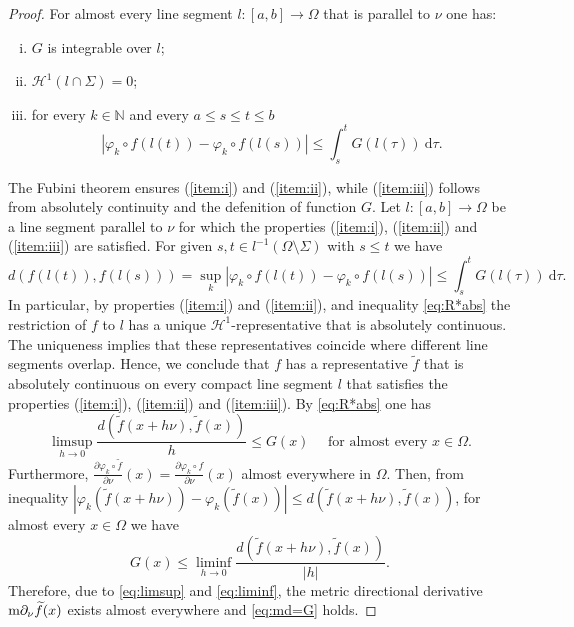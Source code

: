 \documentclass[reqno]{amsart}
\begin{document}
\begin{proof}
For almost every line segment
$l:[a,b]\to\Omega$ that is parallel to $\nu$ one has:
\begin{enumerate}[(i)]
\item  \label{item:i} $G$ is integrable over $l$;
\item  \label{item:ii} $\mathcal{H}^1(l\cap\Sigma) = 0$;
\item \label{item:iii} for every $k \in\mathbb N$ and every $a\leq s\leq t\leq b$
\begin{equation}\label{eq:lemma2.13-condition-c}
|\varphi_{k}\circ f(l(t)) - \varphi_{k}\circ f(l(s))| \leq \int_s^tG(l(\tau)) \ \textrm{d}\tau.
\end{equation}
\end{enumerate}    
The Fubini theorem ensures (\ref{item:i}) and (\ref{item:ii}), while (\ref{item:iii}) follows from absolutely continuity and the defenition of function $G$.
Let $l\colon [a,b] \to \Omega$ be a line segment parallel to $\nu$ for which the properties (\ref{item:i}), (\ref{item:ii}) and (\ref{item:iii}) are satisfied. 
For given $s,t\in l^{-1}(\Omega \setminus \Sigma)$ with $s\leq t$
we have
\begin{equation}\label{eq:R*abs}
d(f(l(t)),f(l(s))) = \sup_k | \varphi_{k}\circ f(l(t)) - \varphi_{k}\circ f(l(s)) | \leq \int_s^tG(l(\tau)) \ \textrm{d}\tau.
\end{equation}
In particular, by properties (\ref{item:i}) and (\ref{item:ii}), and inequality \eqref{eq:R*abs} the restriction of $f$ to $l$ has a unique $\mathcal{H}^1$-representative that is absolutely continuous. The uniqueness implies that these representatives coincide where different line segments overlap. 
Hence, we conclude that $f$ has a representative $\widetilde{f}$ that is absolutely continuous on every compact line segment $l$ that satisfies the properties (\ref{item:i}), (\ref{item:ii}) and (\ref{item:iii}). 
By \eqref{eq:R*abs}  one has 
\begin{equation}\label{eq:limsup}
\limsup_{h\to 0} \frac{d(\widetilde f(x+h\nu),\widetilde f(x))}{h} \leq G(x) 
\quad \text{ for almost every } x\in\Omega.
\end{equation}
Furthermore, $\frac{\partial \varphi_{k}\circ \widetilde f}{\partial\nu}(x) = \frac{\partial \varphi_{k}\circ f}{\partial\nu}(x)$ almost everywhere in $\Omega$.
Then, from inequality $|\varphi_k(\widetilde f(x+h\nu)) - \varphi_k(\widetilde f(x))| \leq d(\widetilde f(x+h\nu),\widetilde f(x))$, for almost every $x\in\Omega$ we have
\begin{equation}\label{eq:liminf}
G(x) \leq \liminf_{h\to 0} \frac{d(\widetilde f(x+h\nu),\widetilde f(x))}{|h|}.
\end{equation}
Therefore, due to \eqref{eq:limsup} and \eqref{eq:liminf}, the metric directional derivative $\textnormal{m}\partial_\nu \widetilde f(x)$ exists almost everywhere and \eqref{eq:md=G} holds. 
\end{proof}
\end{document}
